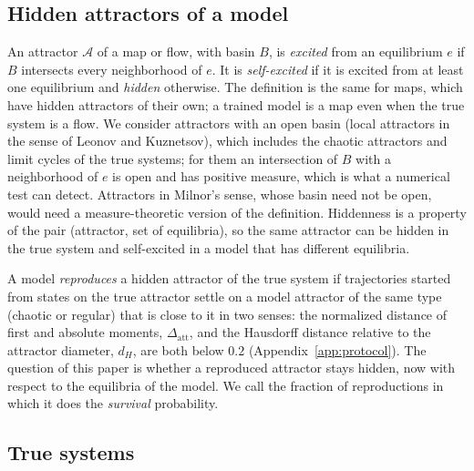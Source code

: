 \subsection{Hidden attractors of a model}
\label{sec:hidden}

An attractor $\mathcal{A}$ of a map or flow, with basin $B$, is \emph{excited} from an equilibrium $e$ if $B$ intersects
every neighborhood of $e$. It is \emph{self-excited} if it is excited from at least one equilibrium and \emph{hidden}
otherwise.\cite{LeonovKuznetsov2013,Dudkowski2016} The definition is the same for maps, which have hidden attractors of
their own;\cite{Jiang2016Maps} a trained model is a map even when the true system is a flow. We consider attractors with an open basin (local attractors
in the sense of Leonov and Kuznetsov), which includes the chaotic attractors and limit cycles of the true systems; for them
an intersection of $B$ with a neighborhood of $e$ is open and has positive measure, which is what a numerical test can
detect. Attractors in Milnor's sense,\cite{Milnor1985Attractor} whose basin need not be open, would need a measure-theoretic
version of the definition. Hiddenness is a property of the pair
(attractor, set of equilibria), so the same attractor can be hidden in the true system and self-excited in a model that
has different equilibria.

A model \emph{reproduces} a hidden attractor of the true system if trajectories started from states on the true attractor
settle on a model attractor of the same type (chaotic or regular) that is close to it in two senses: the normalized
distance of first and absolute moments, $\Delta_{\mathrm{att}}$, and the Hausdorff distance relative to the attractor
diameter, $d_H$, are both below $0.2$ (Appendix~\ref{app:protocol}). The question of this paper is whether a reproduced
attractor stays hidden, now with respect to the equilibria of the model. We call the fraction of reproductions in which it
does the \emph{survival} probability.

\subsection{True systems}
\label{sec:systems}



